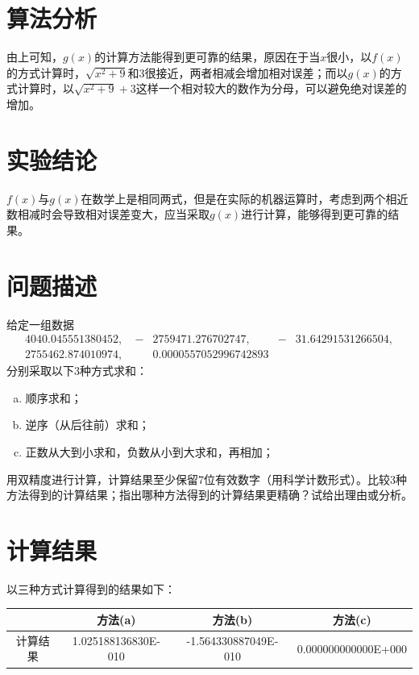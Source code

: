 \documentclass[11pt]{article}
\begin{document}
\section{算法分析}
由上可知，$g(x)$的计算方法能得到更可靠的结果，原因在于当$x$很小，以$f(x)$的方式计算时，$\sqrt{x^2 + 9}$和$3$很接近，两者相减会增加相对误差；而以$g(x)$的方式计算时，以$\sqrt{x^2 + 9} + 3$这样一个相对较大的数作为分母，可以避免绝对误差的增加。

\section{实验结论}
$f(x)$与$g(x)$在数学上是相同两式，但是在实际的机器运算时，考虑到两个相近数相减时会导致相对误差变大，应当采取$g(x)$进行计算，能够得到更可靠的结果。

\section{问题描述}
给定一组数据
\begin{align*}
     & 4040.045551380452,\   & - & 2759471. 276702747,\  & - & 31. 64291531266504, & \\
     & 2755462.874010974 ,\  &   & 0.0000557052996742893 &   &                     &
\end{align*}
分别采取以下3种方式求和：
\begin{enumerate}[(a)]
    \item 顺序求和；
    \item 逆序（从后往前）求和；
    \item 正数从大到小求和，负数从小到大求和，再相加；
\end{enumerate}

用双精度进行计算，计算结果至少保留7位有效数字（用科学计数形式）。比较3种方法得到的计算结果；指出哪种方法得到的计算结果更精确？试给出理由或分析。

\section{计算结果}
以三种方式计算得到的结果如下：
\begin{table}[h]
    \centering
    \begin{tabular}{|c|c|c|c|}
        \hline
                 & 方法(a)             & 方法(b)              & 方法(c)             \\ \hline
        计算结果 & 1.025188136830E-010 & -1.564330887049E-010 & 0.000000000000E+000 \\ \hline
    \end{tabular}
\end{table}
\end{document}
